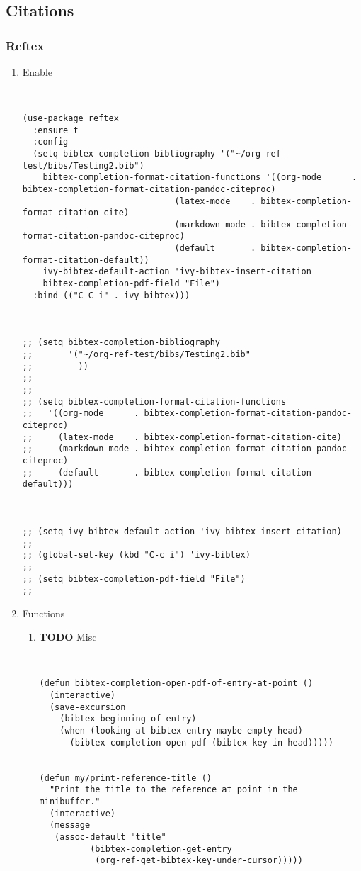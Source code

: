 \documentclass[11pt]{article}
\begin{document}
\subsection{Citations}
\label{sec:org7dc6232}
\subsubsection{Reftex}
\label{sec:org18f9316}
\begin{enumerate}
\item Enable
\label{sec:orgcb7e8a4}
\begin{verbatim}


(use-package reftex
  :ensure t
  :config
  (setq bibtex-completion-bibliography '("~/org-ref-test/bibs/Testing2.bib")
	bibtex-completion-format-citation-functions '((org-mode      . bibtex-completion-format-citation-pandoc-citeproc)
						      (latex-mode    . bibtex-completion-format-citation-cite)
						      (markdown-mode . bibtex-completion-format-citation-pandoc-citeproc)
						      (default       . bibtex-completion-format-citation-default))
	ivy-bibtex-default-action 'ivy-bibtex-insert-citation
	bibtex-completion-pdf-field "File")
  :bind (("C-C i" . ivy-bibtex)))



;; (setq bibtex-completion-bibliography
;;       '("~/org-ref-test/bibs/Testing2.bib"
;;         ))
;; 
;; 
;; (setq bibtex-completion-format-citation-functions
;;   '((org-mode      . bibtex-completion-format-citation-pandoc-citeproc)
;;     (latex-mode    . bibtex-completion-format-citation-cite)
;;     (markdown-mode . bibtex-completion-format-citation-pandoc-citeproc)
;;     (default       . bibtex-completion-format-citation-default)))



;; (setq ivy-bibtex-default-action 'ivy-bibtex-insert-citation)
;; 
;; (global-set-key (kbd "C-c i") 'ivy-bibtex)
;; 
;; (setq bibtex-completion-pdf-field "File")
;; 
\end{verbatim}
\item Functions
\label{sec:org6755e86}
\begin{enumerate}
\item {\bfseries\sffamily TODO} Misc
\label{sec:orga2fde19}
\begin{verbatim}


(defun bibtex-completion-open-pdf-of-entry-at-point ()
  (interactive)
  (save-excursion
    (bibtex-beginning-of-entry)
    (when (looking-at bibtex-entry-maybe-empty-head)
      (bibtex-completion-open-pdf (bibtex-key-in-head)))))


(defun my/print-reference-title ()
  "Print the title to the reference at point in the minibuffer."
  (interactive)
  (message
   (assoc-default "title"
		  (bibtex-completion-get-entry
		   (org-ref-get-bibtex-key-under-cursor)))))




\end{verbatim}
\end{enumerate}
\end{enumerate}
\end{document}
